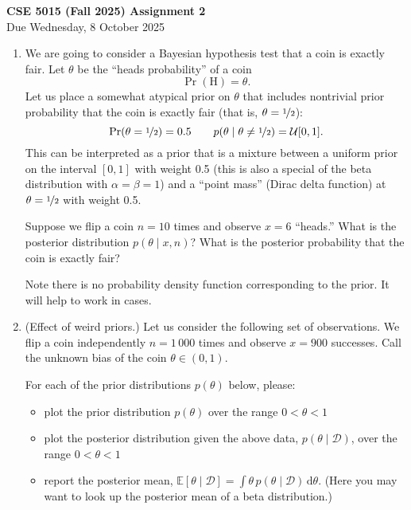 \documentclass{article}
\newcommand{\given}{\mid}
\newcommand{\mc}[1]{\mathcal{#1}}
\newcommand{\data}{\mc{D}}
\newcommand{\intd}[1]{\,\mathrm{d}{#1}}
\begin{document}
{\large \textbf{CSE 5015 (Fall 2025) Assignment 2}} \\
Due Wednesday, 8 October 2025 \\

\begin{enumerate}

\item

  We are going to consider a Bayesian hypothesis test that a coin is
  exactly fair. Let $\theta$ be the ``heads probability'' of a coin
  \[
    \Pr(\text{H}) = \theta.
  \]
  Let us place a somewhat atypical prior on $\theta$ that includes
  nontrivial prior probability that the coin is exactly fair (that is,
  $\theta = \nicefrac{1}{2}$):
  \[
    \Pr(\theta = \nicefrac{1}{2}) = 0.5
    \qquad
    p(\theta \given \theta \neq \nicefrac{1}{2}) = \mc{U}[0, 1].
  \]
  This can be interpreted as a prior that is a mixture between a uniform
  prior on the interval $[0, 1]$ with weight 0.5 (this is also a special
  of the beta distribution with $\alpha = \beta = 1$) and a ``point
  mass'' (Dirac delta function) at $\theta = \nicefrac{1}{2}$ with
  weight 0.5.

  Suppose we flip a coin $n = 10$ times and observe $x = 6$ ``heads.''
  What is the posterior distribution $p(\theta \given x, n)$?  What is
  the posterior probability that the coin is exactly fair?

  Note there is no probability density function corresponding to the
  prior. It will help to work in cases.

\item
  (Effect of weird priors.)  Let us consider the following set of
  observations. We flip a coin independently $n = 1\,000$ times and
  observe $x = 900$ successes. Call the unknown bias of the coin
  $\theta \in (0, 1)$.

  For each of the prior distributions $p(\theta)$ below, please:
  \begin{itemize}
  \item
    plot the prior distribution $p(\theta)$ over the range $0 < \theta < 1$
  \item
    plot the posterior distribution given the above data, $p(\theta
    \given \data)$, over the range $0 < \theta < 1$
  \item
    report the posterior mean,
    $\mathbb{E}[\theta \given \data] = \int \theta\,p(\theta\given\data)\intd\theta$.
    (Here you may want to look up the posterior mean of a beta distribution.)
  \end{itemize}


\end{enumerate}
\end{document}
